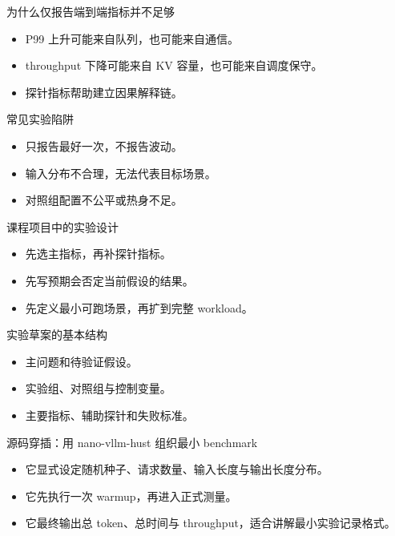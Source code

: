 \begin{frame}{为什么仅报告端到端指标并不足够}
  \begin{itemize}
    \item P99 上升可能来自队列，也可能来自通信。
    \item throughput 下降可能来自 KV 容量，也可能来自调度保守。
    \item 探针指标帮助建立因果解释链。
  \end{itemize}
\end{frame}

\begin{frame}{常见实验陷阱}
  \begin{itemize}
    \item 只报告最好一次，不报告波动。
    \item 输入分布不合理，无法代表目标场景。
    \item 对照组配置不公平或热身不足。
  \end{itemize}
\end{frame}

\begin{frame}{课程项目中的实验设计}
  \begin{itemize}
    \item 先选主指标，再补探针指标。
    \item 先写预期会否定当前假设的结果。
    \item 先定义最小可跑场景，再扩到完整 workload。
  \end{itemize}
\end{frame}

\begin{frame}{实验草案的基本结构}
  \begin{itemize}
    \item 主问题和待验证假设。
    \item 实验组、对照组与控制变量。
    \item 主要指标、辅助探针和失败标准。
  \end{itemize}
\end{frame}

\begin{frame}{源码穿插：用 nano-vllm-hust 组织最小 benchmark}
  \begin{itemize}
    \item 它显式设定随机种子、请求数量、输入长度与输出长度分布。
    \item 它先执行一次 warmup，再进入正式测量。
    \item 它最终输出总 token、总时间与 throughput，适合讲解最小实验记录格式。
  \end{itemize}
\end{frame}

